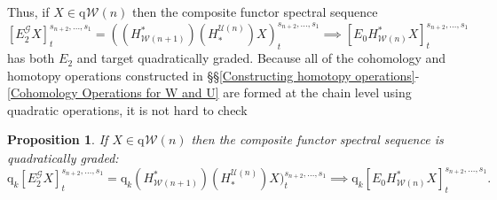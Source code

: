 \documentclass[11pt]{amsart} \renewcommand{\baselinestretch}{1.2}
\theoremstyle{plain}
\newtheorem{prop}[thm]{Proposition}
\theoremstyle{definition}
\newcommand{\scrG}{\mathscr{G}}
\newcommand{\calU}{\mathcal{U}}
\newcommand{\calw}{\mathcal{W}}
\newcommand{\BSW}{{\scrG}}
\newcommand{\quadgrad}[1]{\mathrm{q}_{#1}}
\newcommand{\E}[5]{[E^{#1}_{#2}#3]^{#4}_{#5}}
\newcommand{\Edown}[4]{[E_{#1}#2]^{#3}_{#4}}
\begin{document}
\begin{Composite functor spectral sequences}
Thus, if $X\in\quadgrad{}\calw(n)$ then the composite functor spectral sequence
\[\E{\BSW}{2}{X}{s_{n+2},\ldots,s_1}{t}=((H^*_{\calw(n+1)})(H_*^{\calU(n)})X)^{s_{n+2},\ldots,s_1}_t\implies \Edown{0}{H^*_{\calw(n)}X}{s_{n+2},\ldots,s_1}{t}\]
has both $E_2$ and target quadratically graded. Because all of the cohomology and homotopy operations constructed in \S\S\ref{Constructing homotopy operations}-\ref{Cohomology Operations for W and U} are formed at the chain level using quadratic operations, it is not hard to check
\begin{prop}
\label{prop: cfsseq is quad graded}
If $X\in\quadgrad{}\calw(n)$ then the composite functor spectral sequence is quadratically graded:
\[\quadgrad{k}\E{\BSW}{2}{X}{s_{n+2},\ldots,s_1}{t}=\quadgrad{k}(H^*_{\calw(n+1)})(H_*^{\calU(n)})X)^{s_{n+2},\ldots,s_1}_t\implies \quadgrad{k}\Edown{0}{H^*_{\calw(n)}X}{s_{n+2},\ldots,s_1}{t}.\]
\end{prop}



\end{Composite functor spectral sequences}
\end{document}
